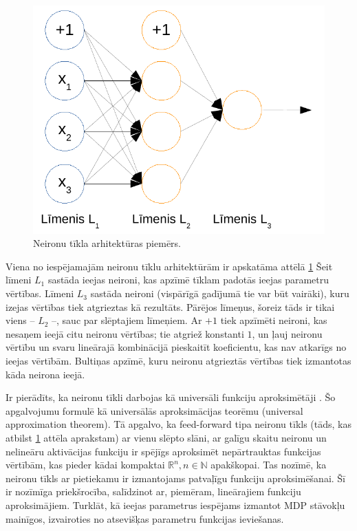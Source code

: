 \documentclass{ludis} %
\begin{document}
\begin{figure}
	\centering
	\includegraphics{Img/nn-arhitektura.pdf}
	\caption{Neironu tīkla arhitektūras piemērs.}
	\label{fig:nn}
\end{figure}

Viena no iespējamajām neironu tīklu arhitektūrām ir apskatāma attēlā \ref{fig:nn}
Šeit līmeni $L_1$ sastāda ieejas neironi, kas apzīmē tīklam padotās ieejas parametru vērtības.
Līmeni $L_3$ sastāda neironi (vispārīgā gadījumā tie var būt vairāki), kuru izejas vērtības tiek atgrieztas kā rezultāts.
Pārējos līmeņus, šoreiz tāds ir tikai viens -- $L_2$ --, sauc par slēptajiem līmeņiem.
Ar $+1$ tiek apzīmēti neironi, kas nesaņem ieejā citu neironu vērtības; tie atgriež konstanti $1$, un ļauj neironu vērtību un svaru lineārajā kombinācijā pieskaitīt koeficientu, kas nav atkarīgs no ieejas vērtībām.
Bultiņas apzīmē, kuru neironu atgrieztās vērtības tiek izmantotas kāda neirona ieejā.

Ir pierādīts, ka neironu tīkli darbojas kā universāli funkciju aproksimētāji \autocite{hornik1991approximation}.
Šo apgalvojumu formulē kā universālās aproksimācijas teorēmu (universal approximation theorem).
Tā apgalvo, ka feed-forward tipa neironu tīkls (tāds, kas atbilst \ref{fig:nn} attēla aprakstam) ar vienu slēpto slāni, ar galīgu skaitu neironu un nelineāru aktivācijas funkciju ir spējīgs aproksimēt nepārtrauktas funkcijas vērtībām, kas pieder kādai kompaktai $\mathbb{R}^n, n \in \mathbb{N}$ apakškopai.
Tas nozīmē, ka neironu tīkls ar pietiekamu ir izmantojams patvaļīgu funkciju aproksimēšanai.
Šī ir nozīmīga priekšrocība, salīdzinot ar, piemēram, lineārajiem funkciju aproksimājiem.
Turklāt, kā ieejas parametrus iespējams izmantot MDP stāvokļu mainīgos, izvairoties no atsevišķas parametru funkcijas ieviešanas.
\end{document}
